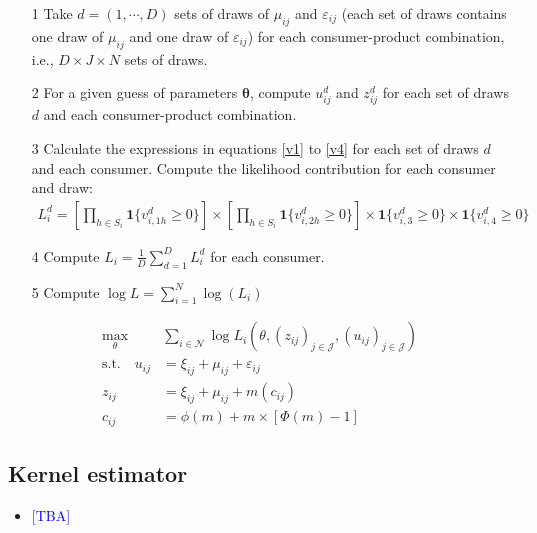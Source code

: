\documentclass[12pt]{article}
\renewcommand*{\epsilon}{\varepsilon}
\begin{document}
\begin{itemize}
    \item[1] Take $d = (1, \cdots, D)$ sets of draws of $\mu_{ij}$ and $\epsilon_{ij}$ (each set of draws contains one draw of $\mu_{ij}$ and one draw of $\epsilon_{ij}$) for each consumer-product combination, i.e., $D\times J \times N$ sets of draws.
    \item[2] For a given guess of parameters $\bm{\theta}$, compute $u^d_{ij}$ and $z^d_{ij}$ for each set of draws $d$ and each consumer-product combination.
    \item[3] Calculate the expressions in equations \eqref{v1} to \eqref{v4} for each set of draws $d$ and each consumer. Compute the likelihood contribution for each consumer and draw:
    \begin{align*}
        L_i^d = \left[\prod_{h \in S_i} \bm{1}\{v^d_{i,1h} \geq 0\} \right] \times \left[\prod_{h \in S_i} \bm{1}\{v^d_{i,2h} \geq 0\} \right] \times  \bm{1}\{v^d_{i,3} \geq 0\}  \times  \bm{1}\{v^d_{i,4} \geq 0\}
    \end{align*}
    \item[4] Compute $L_i = \frac{1}{D}\sum_{d = 1}^D L_i^d$ for each consumer.
    \item[5] Compute $\log L = \sum_{i = 1}^N \log(L_i)$
\end{itemize}

\begin{align*}
    \max_{\theta}& \sum_{i\in \mathcal{N}} \log L_{i}(\theta,(z_{ij})_{j\in \mathcal{J}},(u_{ij})_{j\in \mathcal{J}})\nonumber\\
    \text{s.t.}\quad u_{i j} & =\xi_{i j}+\mu_{i j}+\varepsilon_{i j}\label{eq:mpec_formula}\\
    z_{i j}&=\xi_{i j}+\mu_{i j}+m\left(c_{i j}\right) \nonumber\\
    c_{i j}&=\phi(m)+m \times[\Phi(m)-1] \nonumber
\end{align*}

\subsection{Kernel estimator}

\begin{itemize}
    \item \textcolor{blue}{[TBA]}
\end{itemize}



\end{document}
